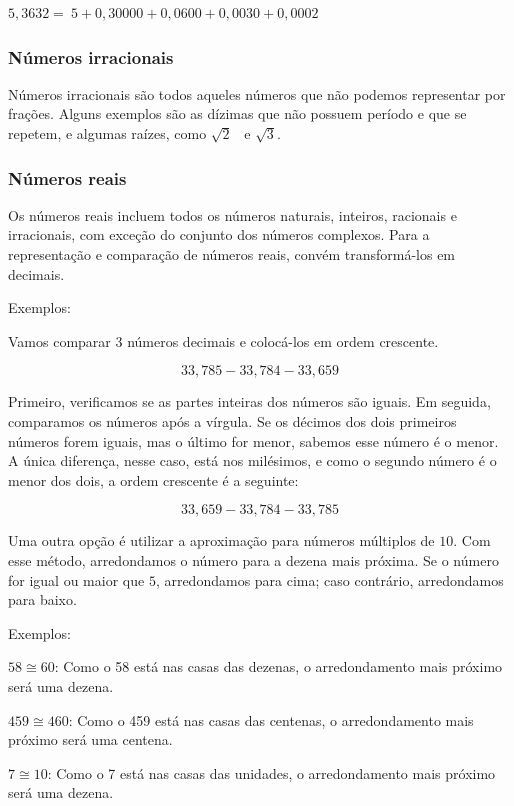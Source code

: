 {$5,3632 = \ 5 + 0,30000 + 0,0600 + 0,0030 + 0,0002$

\subsubsection*{Números irracionais}

Números irracionais são todos aqueles números que não podemos representar por frações.
Alguns exemplos são as dízimas que não possuem período e que se repetem,
e algumas raízes, como $\sqrt{2}$ \ e $\sqrt{3}$.

\subsubsection{Números reais}

Os números reais incluem
todos os números naturais, inteiros, racionais e irracionais, com exceção do
conjunto dos números complexos. Para a representação e
comparação de números reais, convém transformá-los em decimais. 

\medskip \noindent Exemplos:

Vamos comparar 3 números decimais e colocá-los em ordem crescente.

$$33,785  - 33,784  - 33,659$$

Primeiro, verificamos se as partes inteiras dos números são iguais. Em
seguida, comparamos os números após a vírgula. Se os décimos dos dois
primeiros números forem iguais, mas o último for menor, sabemos  esse número
é o menor. A única diferença, nesse caso, está nos milésimos, e como o
segundo número é o menor dos dois, a ordem crescente é a seguinte:

$$33,659  - 33,784  - 33,785$$

Uma outra opção é utilizar a aproximação para números múltiplos de $10$. Com
esse método, arredondamos o número para a dezena mais próxima. Se o número
for igual ou maior que $5$, arredondamos para cima; caso contrário,
arredondamos para baixo.

\medskip\noindent Exemplos:

$58\cong 60$: Como o 58 está nas casas das dezenas, o
arredondamento mais próximo será uma dezena.\medskip

$459\cong 460$: Como o 459 está nas casas das centenas, o
arredondamento mais próximo será uma centena.\medskip

$7\cong 10$: Como o 7 está nas casas das unidades, o
arredondamento mais próximo será uma dezena.

}


